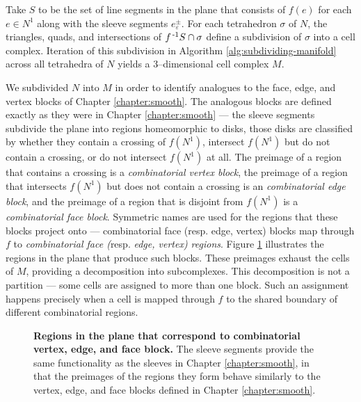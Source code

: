 Take $S$ to be the set of line segments in the plane that consists of $f(e)$ for each $e\in N^1$ along with the sleeve segments $e_\varepsilon^\pm$.
For each tetrahedron $\sigma$ of $N$, the triangles, quads, and intersections of $f^{\,\text{-}1} S\cap\sigma$ define a subdivision of $\sigma$ into a cell complex.
Iteration of this subdivision in Algorithm \ref{alg:subdividing-manifold} across all tetrahedra of $N$ yields a 3--dimensional cell complex $M$.

We subdivided $N$ into $M$ in order to identify analogues to the face, edge, and vertex blocks of Chapter \ref{chapter:smooth}.
The analogous blocks are defined exactly as they were in Chapter \ref{chapter:smooth} --- the sleeve segments subdivide the plane into regions homeomorphic to disks, those disks are classified by whether they contain a crossing of $f(N^1)$, intersect $f(N^1)$ but do not contain a crossing, or do not intersect $f(N^1)$ at all.
The preimage of a region that contains a crossing is a \emph{combinatorial vertex block}, the preimage of a region that intersects $f(N^1)$ but does not contain a crossing is an \emph{combinatorial edge block}, and the preimage of a region that is disjoint from $f(N^1)$ is a \emph{combinatorial face block}.
Symmetric names are used for the regions that these blocks project onto --- combinatorial face (resp. edge, vertex) blocks map through $f$ to \emph{combinatorial face (}resp. \emph{edge, vertex) regions}.
Figure \ref{fig:pl-regions} illustrates the regions in the plane that produce such blocks.
These preimages exhaust the cells of $M$, providing a decomposition into subcomplexes.
This decomposition is not a partition --- some cells are assigned to more than one block.
Such an assignment happens precisely when a cell is mapped through $f$ to the shared boundary of different combinatorial regions.


\begin{figure}[h!]
	\caption{
		\textbf{Regions in the plane that correspond to combinatorial vertex, edge, and face block.}
		The sleeve segments provide the same functionality as the sleeves in Chapter \ref{chapter:smooth}, in that the preimages of the regions they form behave similarly to the vertex, edge, and face blocks defined in Chapter \ref{chapter:smooth}.
	}
	\label{fig:pl-regions}
\end{figure}

